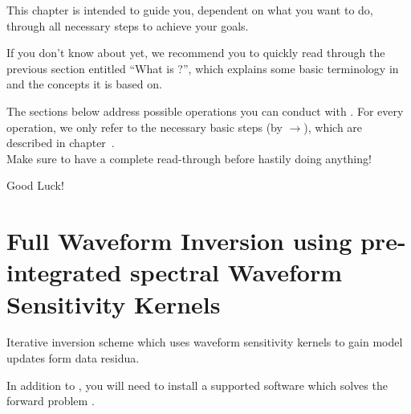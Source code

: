 
%
%
%
This chapter is intended to guide you, dependent on what you want to do, through all necessary steps
to achieve your goals.

If you don't know about \ASKI{} yet, we recommend you to quickly read through the previous section 
entitled ``What is \ASKI{}?'', which explains some basic terminology in \ASKI{} and the concepts it is based on.

The sections below address possible operations you can conduct with \ASKI{}. For every operation, we only refer 
to the necessary basic steps (by $\rightarrow$), which are described in chapter~.\\
Make sure to have a complete read-through before hastily doing anything!

Good Luck!
%
%
\newpage
\section*{Full Waveform Inversion using pre-integrated spectral Waveform Sensitivity Kernels} \label{guide,sec:classic_inversion}
%
%

Iterative inversion scheme which uses waveform sensitivity kernels to gain model updates form data residua.

In addition to \ASKI{} , you will need to install a supported software which 
solves the forward problem .
%
